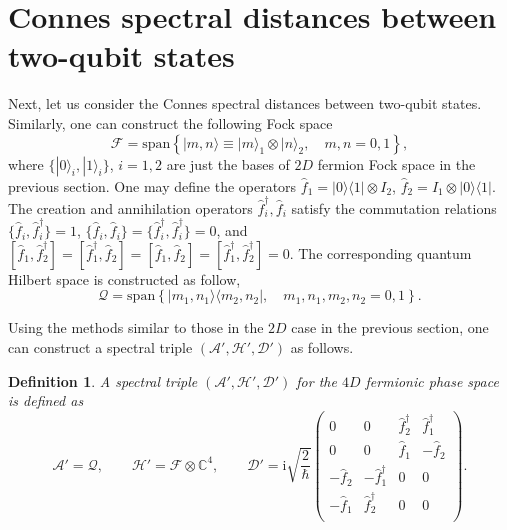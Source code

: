 \documentclass[a4paper,12pt]{article}
\newtheorem{definition}{Definition}
\begin{document}
\section{Connes spectral distances between two-qubit states}\label{sec6}
Next, let us consider the Connes spectral distances between two-qubit states.
Similarly, one can construct the following Fock space
\begin{equation}
	\mathcal{F}=\mathrm{span}\left\{|m,n\rangle\equiv|m\rangle_{\!1}\otimes|n\rangle_{\!2},
	\quad m,n=0,1\right\},
\end{equation}
where $\{|0 \rangle_{\!i}, |1 \rangle_{\!i}\}$, $i=1,2$ are just the bases of $2D$ fermion Fock space in the previous section.
One may define the operators $\hat{f}_1	=|0\rangle \langle 1 |\otimes I_2$, $\hat{f}_2=I_1\otimes|0\rangle \langle 1 |$. The creation and annihilation operators $\hat{f}_i^\dag, \hat{f}_i$ satisfy the commutation relations $\{\hat{f}_i,\hat{f}_i^{\dag}\}=1$, $\{\hat{f}_i,\hat{f}_i\}=\{\hat{f}_i^{\dag},\hat{f}_i^{\dag}\}=0$, and $[\hat{f}_1,\hat{f}_2^{\dag}]=[\hat{f}_1^{\dag},\hat{f}_2]=[\hat{f}_1,\hat{f}_2]=[\hat{f}_1^{\dag},\hat{f}_2^{\dag}]=0$.
The corresponding quantum Hilbert space is constructed as follow,
\begin{equation}
	\mathcal{Q}=\mathrm{span}\left\{|m_1,n_1\rangle\langle m_2,n_2|,
	\quad m_1,n_1,m_2,n_2=0,1\right\}.
\end{equation}

Using the methods similar to those in the $2D$ case in the previous section, one can construct a spectral triple $(\mathcal{A}',\mathcal{H}',\mathcal{D}')$ as follows.
\begin{definition}
	A spectral triple $(\mathcal{A}',\mathcal{H}',\mathcal{D}')$ for the $4D$ fermionic phase space is defined as
	\begin{equation}\label{do2}
		\mathcal{A}'=\mathcal{Q},
		\qquad\mathcal{H}'=\mathcal{F}\otimes \mathds{C}^4,
		\qquad
		\mathcal{D}'=\mathrm{i}\sqrt{\frac{2}{\hbar}}\left(
		\begin{array}{cccc}
			0 & 0 & \hat{f}_2^\dag & \hat{f}_1^\dag \\
			0 & 0 &  \hat{f}_1 & -\hat{f}_2 \\
			-\hat{f}_2 & -\hat{f}_1^\dag & 0 & 0 \\
			-\hat{f}_1 & \hat{f}_2^\dag & 0 & 0 \\
		\end{array}\right).
	\end{equation}
\end{definition}
\end{document}

